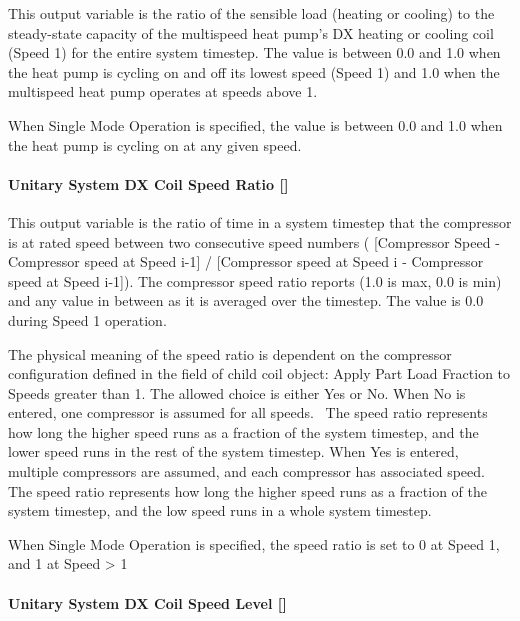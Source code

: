 This output variable is the ratio of the sensible load (heating or cooling) to the steady-state capacity of the multispeed heat pump's DX heating or cooling coil (Speed 1) for the entire system timestep. The value is between 0.0 and 1.0 when the heat pump is cycling on and off its lowest speed (Speed 1) and 1.0 when the multispeed heat pump operates at speeds above 1.

When Single Mode Operation is specified, the value is between 0.0 and 1.0 when the heat pump is cycling on at any given speed.

\paragraph{\texorpdfstring{Unitary System DX Coil Speed Ratio {[]}}{Unitary System DX Coil Speed Ratio }}\label{unitary-system-dx-coil-speed-ratio-1}

This output variable is the ratio of time in a system timestep that the compressor is at rated speed between two consecutive speed numbers ( {[}Compressor Speed - Compressor speed at Speed i-1{]} / {[}Compressor speed at Speed i - Compressor speed at Speed i-1{]}). The compressor speed ratio reports (1.0 is max, 0.0 is min) and any value in between as it is averaged over the timestep. The value is 0.0 during Speed 1 operation.

The physical meaning of the speed ratio is dependent on the compressor configuration defined in the field of child coil object: Apply Part Load Fraction to Speeds greater than 1. The allowed choice is either Yes or No. When No is entered, one compressor is assumed for all speeds. ~The speed ratio represents how long the higher speed runs as a fraction of the system timestep, and the lower speed runs in the rest of the system timestep. When Yes is entered, multiple compressors are assumed, and each compressor has associated speed. The speed ratio represents how long the higher speed runs as a fraction of the system timestep, and the low speed runs in a whole system timestep.

When Single Mode Operation is specified, the speed ratio is set to 0 at Speed 1, and 1 at Speed \textgreater{} 1

\paragraph{\texorpdfstring{Unitary System DX Coil Speed Level {[]}}{Unitary System DX Coil Speed Level }}\label{unitary-system-dx-coil-speed-level-1}

